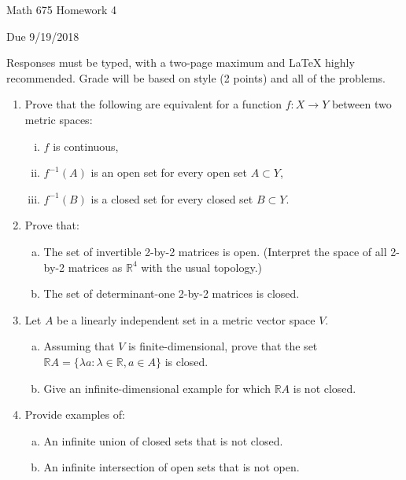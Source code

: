 \documentclass[12pt,letterpaper,reqno]{amsart}
\newcommand{\R}{\mathbb R}
\begin{document}
\thispagestyle{empty}
\centerline{\Large Math 675 Homework 4}
\centerline{Due 9/19/2018}
\vspace{.25in}

Responses must be typed, with a two-page maximum and LaTeX highly recommended. Grade will be based on style (2 points) and all of the problems.

\begin{enumerate}[1.]
\item Prove that the following are equivalent for a function $f: X\rightarrow Y$ between two metric spaces:
\begin{enumerate}[(i)]
\item $f$ is continuous,
\item $f^{-1}(A)$ is an open set for every open set $A\subset Y$,
\item $f^{-1}(B)$ is a closed set for every closed set $B\subset Y$.
\end{enumerate}
\item Prove that:
\begin{enumerate}[(a)]
\item The set of invertible 2-by-2 matrices is open. (Interpret the space of all 2-by-2 matrices as $\R^4$ with the usual topology.)
\item The set of determinant-one 2-by-2 matrices is closed.
\end{enumerate}
\item Let $A$ be a linearly independent set in a metric vector space $V$.
\begin{enumerate}[(a)]
\item Assuming that $V$ is finite-dimensional, prove that the set $\R A=\{\lambda a : \lambda \in \R, a\in A\}$ is closed.
\item Give an infinite-dimensional example for which $\R A$ is not closed.
\end{enumerate}
\item Provide examples of:
\begin{enumerate}[(a)]
\item An infinite union of closed sets that is not closed.
\item An infinite intersection of open sets that is not open.
\end{enumerate}
\end{enumerate}
\end{document}
